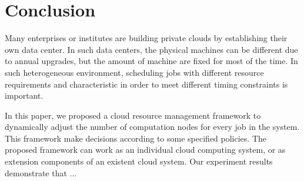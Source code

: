 \section{Conclusion}\label{sec:conclusion}

Many enterprises or institutes are building private clouds by
establishing their own data center.
In such data centers, the physical machines can be different due to 
annual upgrades,  but the amount of machine are fixed for most of the 
time.
In such heterogeneous environment, scheduling jobs with different 
resource requirements and characteristic in order to meet different 
timing constraints is important.

In this paper, we proposed a cloud resource management framework to
dynamically adjust the number of computation nodes for every job in the
system.
This framework make decisions according to some specified policies.
The proposed framework can work as an individual cloud computing system,
or as extension components of an existent cloud system.
Our experiment results demonstrate that ...

